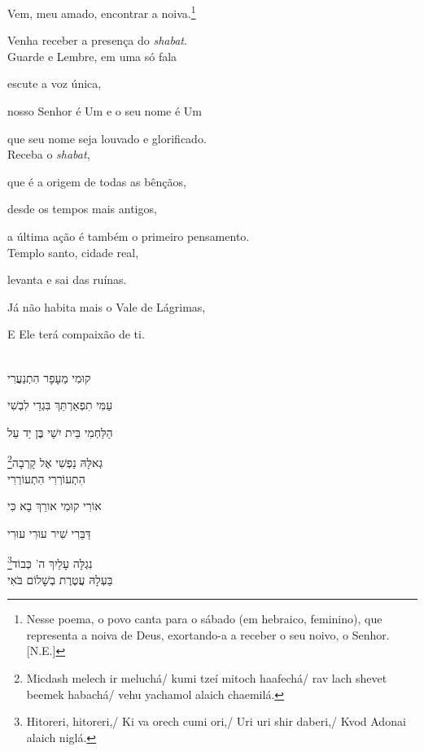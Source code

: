 Vem, {meu amado}, encontrar a noiva.\label{casamento}\footnote{Nesse poema, o povo canta para 
	o sábado (em hebraico, feminino), 
	que representa a noiva de Deus,
	exortando-a a receber o seu noivo, o Senhor. [N.E.]}


Venha receber a presença do \emph{shabat}.\\[10pt]

{Guarde e Lembre}, em uma só fala

escute a voz única,

nosso Senhor é Um e o seu nome é Um

que seu nome seja louvado e glorificado.\\[10pt]

Receba o \emph{shabat},

que é a origem de todas as bênçãos,

desde os tempos mais antigos,

a última ação é também o primeiro pensamento.\\[10pt]

Templo santo, cidade real,

levanta e sai das ruínas.

Já não habita mais o Vale de Lágrimas,

E Ele terá compaixão de ti.\\[10pt]


\movetoevenpage
\raggedleft

\vspace*{1cm}

\textsc{}\\[15pt]

קוּמִי מֵעָפָר הִתְנַעֲרִי

עַמִּי תִפְאַרְתֵּךְ בִּגְדֵי לִבְשִׁי 

הַלַּחְמִי בֵּית יִשַׁי בֶּן יַד עַל

\footnote{Micdash melech ir meluchá/ kumi tzeí mitoch haafechá/ 
		rav lach shevet beemek habachá/ vehu yachamol alaich chaemilá.}גְאלָּהּ נַפְשִׁי אֶל קָרְבָה\\[10pt]

הִתְעוֹרְרִי הִתְעוֹרְרִי

אוֹרִי קוּמִי אורֵךְ בָא כִּי

דַּבֵּרִי שִׁיר עוּרִי עוּרִי

\footnote{Hitoreri, hitoreri,/ Ki va orech cumi ori,/ Uri uri shir daberi,/
Kvod Adonai alaich niglá.}נִגְלָּה עָלַיִךְ ה' כְּבוֹד\\[10pt]

בַּעְלָהּ עֲטֶרֶת בְשָׁלוֹם בֹּאִי

